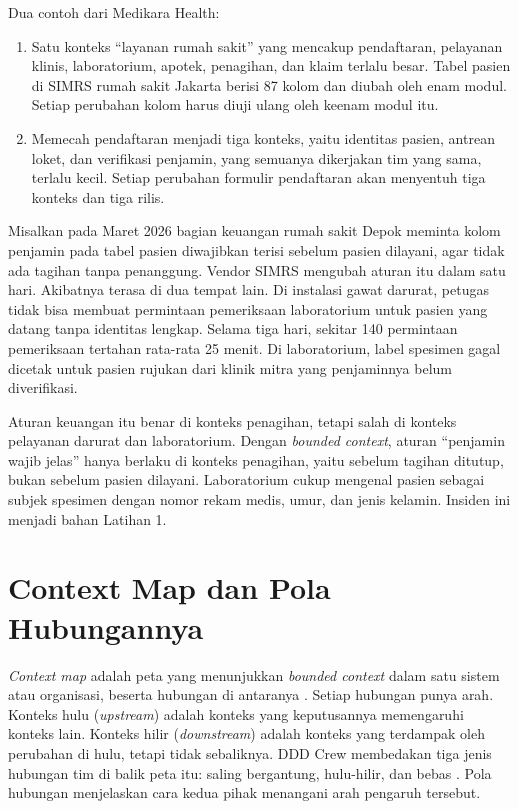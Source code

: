 Dua contoh dari Medikara Health:
\begin{enumerate}
  \item Satu konteks ``layanan rumah sakit'' yang mencakup pendaftaran, pelayanan klinis,
        laboratorium, apotek, penagihan, dan klaim terlalu besar. Tabel pasien di SIMRS rumah sakit
        Jakarta berisi 87 kolom dan diubah oleh enam modul. Setiap perubahan kolom harus diuji
        ulang oleh keenam modul itu.
  \item Memecah pendaftaran menjadi tiga konteks, yaitu identitas pasien, antrean loket, dan
        verifikasi penjamin, yang semuanya dikerjakan tim yang sama, terlalu kecil. Setiap
        perubahan formulir pendaftaran akan menyentuh tiga konteks dan tiga rilis.
\end{enumerate}

\begin{kasus}[title={Kasus Medikara Health: Satu Kolom, Tiga Bagian}]
  Misalkan pada Maret 2026 bagian keuangan rumah sakit Depok meminta kolom penjamin pada tabel
  pasien diwajibkan terisi sebelum pasien dilayani, agar tidak ada tagihan tanpa penanggung. Vendor
  SIMRS mengubah aturan itu dalam satu hari. Akibatnya terasa di dua tempat lain. Di instalasi gawat
  darurat, petugas tidak bisa membuat permintaan pemeriksaan laboratorium untuk pasien yang datang
  tanpa identitas lengkap. Selama tiga hari, sekitar 140 permintaan pemeriksaan tertahan rata-rata
  25 menit. Di laboratorium, label spesimen gagal dicetak untuk pasien rujukan dari klinik mitra
  yang penjaminnya belum diverifikasi.

  Aturan keuangan itu benar di konteks penagihan, tetapi salah di konteks pelayanan darurat dan
  laboratorium. Dengan \textit{bounded context}, aturan ``penjamin wajib jelas'' hanya berlaku di
  konteks penagihan, yaitu sebelum tagihan ditutup, bukan sebelum pasien dilayani. Laboratorium
  cukup mengenal pasien sebagai subjek spesimen dengan nomor rekam medis, umur, dan jenis kelamin.
  Insiden ini menjadi bahan Latihan 1.
\end{kasus}

\section{Context Map dan Pola Hubungannya}
\label{sec:ch06-context-map}

\textit{Context map} adalah peta yang menunjukkan \textit{bounded context} dalam satu sistem atau
organisasi, beserta hubungan di antaranya \cite{evans2003}. Setiap hubungan punya arah. Konteks hulu
(\textit{upstream}) adalah konteks yang keputusannya memengaruhi konteks lain. Konteks hilir
(\textit{downstream}) adalah konteks yang terdampak oleh perubahan di hulu, tetapi tidak sebaliknya.
DDD Crew membedakan tiga jenis hubungan tim di balik peta itu: saling bergantung, hulu-hilir, dan
bebas \cite{c06-dddcrew-contextmap}. Pola hubungan menjelaskan cara kedua pihak menangani arah
pengaruh tersebut.

